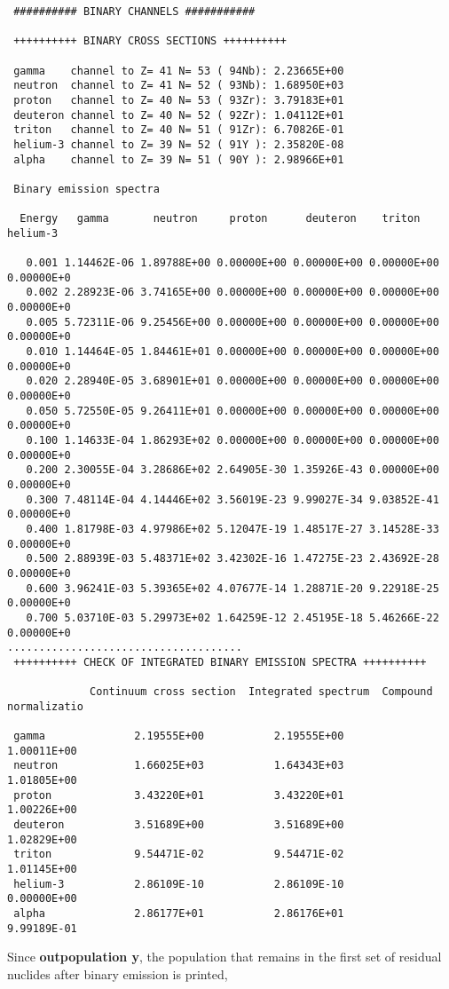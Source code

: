 \begin{samplecase}
{\begin{verbatim}
 ########## BINARY CHANNELS ###########

 ++++++++++ BINARY CROSS SECTIONS ++++++++++

 gamma    channel to Z= 41 N= 53 ( 94Nb): 2.23665E+00
 neutron  channel to Z= 41 N= 52 ( 93Nb): 1.68950E+03
 proton   channel to Z= 40 N= 53 ( 93Zr): 3.79183E+01
 deuteron channel to Z= 40 N= 52 ( 92Zr): 1.04112E+01
 triton   channel to Z= 40 N= 51 ( 91Zr): 6.70826E-01
 helium-3 channel to Z= 39 N= 52 ( 91Y ): 2.35820E-08
 alpha    channel to Z= 39 N= 51 ( 90Y ): 2.98966E+01

 Binary emission spectra

  Energy   gamma       neutron     proton      deuteron    triton      helium-3 

   0.001 1.14462E-06 1.89788E+00 0.00000E+00 0.00000E+00 0.00000E+00 0.00000E+0
   0.002 2.28923E-06 3.74165E+00 0.00000E+00 0.00000E+00 0.00000E+00 0.00000E+0
   0.005 5.72311E-06 9.25456E+00 0.00000E+00 0.00000E+00 0.00000E+00 0.00000E+0
   0.010 1.14464E-05 1.84461E+01 0.00000E+00 0.00000E+00 0.00000E+00 0.00000E+0
   0.020 2.28940E-05 3.68901E+01 0.00000E+00 0.00000E+00 0.00000E+00 0.00000E+0
   0.050 5.72550E-05 9.26411E+01 0.00000E+00 0.00000E+00 0.00000E+00 0.00000E+0
   0.100 1.14633E-04 1.86293E+02 0.00000E+00 0.00000E+00 0.00000E+00 0.00000E+0
   0.200 2.30055E-04 3.28686E+02 2.64905E-30 1.35926E-43 0.00000E+00 0.00000E+0
   0.300 7.48114E-04 4.14446E+02 3.56019E-23 9.99027E-34 9.03852E-41 0.00000E+0
   0.400 1.81798E-03 4.97986E+02 5.12047E-19 1.48517E-27 3.14528E-33 0.00000E+0
   0.500 2.88939E-03 5.48371E+02 3.42302E-16 1.47275E-23 2.43692E-28 0.00000E+0
   0.600 3.96241E-03 5.39365E+02 4.07677E-14 1.28871E-20 9.22918E-25 0.00000E+0
   0.700 5.03710E-03 5.29973E+02 1.64259E-12 2.45195E-18 5.46266E-22 0.00000E+0
.....................................
 ++++++++++ CHECK OF INTEGRATED BINARY EMISSION SPECTRA ++++++++++
 
             Continuum cross section  Integrated spectrum  Compound normalizatio
    
 gamma              2.19555E+00           2.19555E+00           1.00011E+00     
 neutron            1.66025E+03           1.64343E+03           1.01805E+00     
 proton             3.43220E+01           3.43220E+01           1.00226E+00     
 deuteron           3.51689E+00           3.51689E+00           1.02829E+00     
 triton             9.54471E-02           9.54471E-02           1.01145E+00     
 helium-3           2.86109E-10           2.86109E-10           0.00000E+00     
 alpha              2.86177E+01           2.86176E+01           9.99189E-01     
\end{verbatim} } \renewcommand{\baselinestretch}{1.07}\small\normalsize
\noindent
Since {\bf outpopulation y}, the population that remains in the first set of 
residual nuclides after binary emission is printed,


\end{samplecase}
